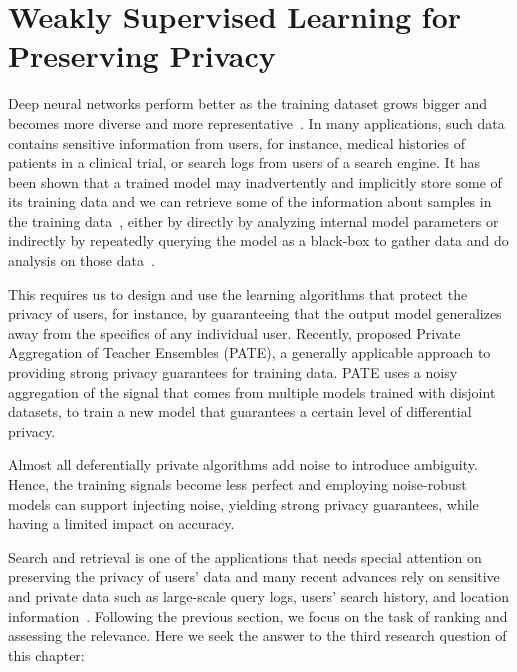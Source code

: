\section{Weakly Supervised Learning for Preserving Privacy}
Deep neural networks perform better as the training dataset grows bigger and becomes more diverse and more representative~\citep{sun2017revisiting}.  In many applications, such data contains sensitive information from users, for instance, medical histories of patients in a clinical trial, or search logs from users of a search engine.  
It has been shown that a trained model may inadvertently
and implicitly store some of its training data and we can retrieve some of the information about samples in the training data~\citep{Shokri:2015}, either by directly by analyzing internal model parameters or indirectly by repeatedly querying the model as a black-box to gather data and do analysis on those data~\citep{Fredrikson:2015}. 

This requires us to design and use the learning algorithms that protect the privacy of users, for instance, by guaranteeing that the output model generalizes away from the specifics of any
individual user. Recently, \citet{Papernot:2017} proposed Private Aggregation of Teacher Ensembles (PATE), a generally applicable approach to providing strong privacy guarantees for training data.  PATE uses a noisy aggregation of the signal that comes from multiple models trained with disjoint datasets, to train a new model that guarantees a certain level of differential privacy.

Almost all deferentially private algorithms add noise to introduce ambiguity. Hence, the training signals become less perfect and employing noise-robust models can support injecting noise, yielding strong privacy guarantees, while having a limited impact on accuracy.

Search and retrieval is one of the applications that needs special attention on preserving the privacy of users' data and many recent advances rely on sensitive and private data such as large-scale query logs, users’ search history, and location information~\citep{Yang:2017}. Following the previous section, we focus on the task of ranking and assessing the relevance.
Here we seek the answer to the third research question of this chapter:

